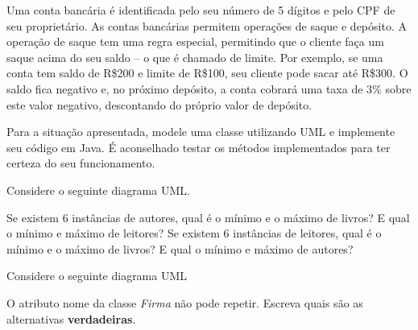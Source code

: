 \documentclass{lib/eng_softdoc}
\begin{document}
\makeheader

\problem  Uma conta bancária é identificada pelo seu número de 5 dígitos e pelo CPF de seu proprietário. As contas bancárias permitem operações de saque e depósito. A operação de saque tem uma regra especial, permitindo que o cliente faça um saque acima do seu saldo – o que é chamado de limite. Por exemplo, se uma conta tem saldo de R\$200 e limite de R\$100, seu cliente pode sacar até R\$300. O saldo fica negativo e, no próximo depósito, a conta cobrará uma taxa de 3\% sobre este valor negativo, descontando do próprio valor de depósito.

Para a situação apresentada, modele uma classe utilizando UML e implemente seu código em Java. É aconselhado testar os métodos implementados para ter certeza do seu funcionamento.

\vspace{0.5cm}

\problem Considere o seguinte diagrama UML. 

\vspace{0.5cm}

\vspace{0.5cm}
\subproblem Se existem 6 instâncias de autores, qual é o mínimo e o máximo de livros? E qual o mínimo e máximo de leitores?
\subproblem Se existem 6 instâncias de leitores, qual é o mínimo e o máximo de livros? E qual o mínimo e máximo de autores?

\vspace{0.5cm}

\problem Considere o seguinte diagrama UML 

\vspace{0.5cm}

\vspace{0.5cm}
O atributo nome da classe \textit{Firma} não pode repetir. Escreva quais são as alternativas \textbf{verdadeiras}.
\end{document}
